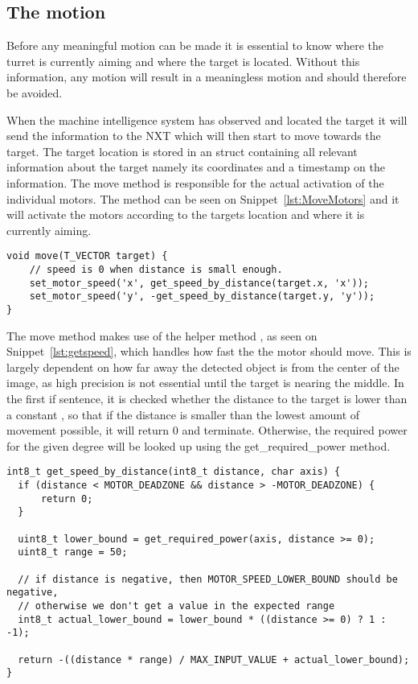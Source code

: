 \subsection{The motion}
Before any meaningful motion can be made it is essential to know where the turret is currently aiming and where the target is located.
Without this information, any motion will result in a meaningless motion and should therefore be avoided.

When the machine intelligence system has observed and located the target it will send the information to the NXT which will then start to move towards the target.
The target location is stored in an struct containing all relevant information about the target namely its coordinates and a timestamp on the information.
The move method is responsible for the actual activation of the individual motors.
The method can be seen on Snippet~\ref{lst:MoveMotors} and it will activate the motors according to the targets location and where it is currently aiming.
\begin{lstlisting}[language=CSharp,caption={move method from movement.c},label={lst:MoveMotors}]
  void move(T_VECTOR target) {
    // speed is 0 when distance is small enough.
    set_motor_speed('x', get_speed_by_distance(target.x, 'x'));
    set_motor_speed('y', -get_speed_by_distance(target.y, 'y'));
}
\end{lstlisting}

The move method makes use of the helper method , as seen on Snippet~\ref{lst:getspeed}, which handles how fast the the motor should move.
This is largely dependent on how far away the detected object is from the center of the image, as high precision is not essential until the target is nearing the middle.
In the first if sentence, it is checked whether the distance to the target is lower than a constant , so that if the distance is smaller than the lowest amount of movement possible, it will return 0 and terminate.
Otherwise, the required power for the given degree will be looked up using the get\_required\_power method.

\begin{lstlisting}[language=CSharp,caption={get\_speed\_by\_distance method from movement.c},label={lst:getspeed}]
int8_t get_speed_by_distance(int8_t distance, char axis) {
  if (distance < MOTOR_DEADZONE && distance > -MOTOR_DEADZONE) {
      return 0;
  }

  uint8_t lower_bound = get_required_power(axis, distance >= 0);
  uint8_t range = 50;

  // if distance is negative, then MOTOR_SPEED_LOWER_BOUND should be negative,
  // otherwise we don't get a value in the expected range
  int8_t actual_lower_bound = lower_bound * ((distance >= 0) ? 1 : -1);

  return -((distance * range) / MAX_INPUT_VALUE + actual_lower_bound);
}
\end{lstlisting}


